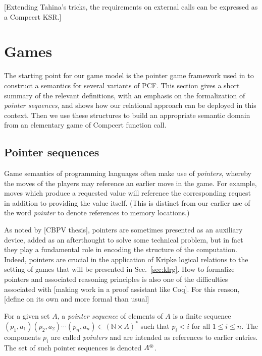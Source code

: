 \documentclass[acmsmall,anonymous]{acmart}
\begin{document}
[Extending Tahina's tricks,
the requirements on
external calls
can be expressed as a Compcert KSR.]



\section{Games} %
\label{sec:games}

The starting point for our game model
is the pointer game framework used in \citep{gamesem99}
to construct a semantics for several variants of PCF.
This section gives a short summary of the relevant definitions,
with an emphasis on the formalization of \emph{pointer sequences},
and shows how our relational approach can be deployed in this context.
Then we use these structures
to build an appropriate semantic domain
from an elementary game of Compcert function call.

\subsection{Pointer sequences} %

Game semantics of programming languages
often make use of \emph{pointers},
whereby the moves of the players
may reference an earlier move in the game.
For example,
moves which produce a requested value
will reference the corresponding request
in addition to providing the value itself.
(This is distinct from
our earlier use of the word \emph{pointer}
to denote references to memory locations.)

As noted by [CBPV thesis],
pointers are sometimes presented as an auxiliary device,
added as an afterthought to solve some technical problem,
but in fact they play a fundamental role
in encoding the structure of the computation.
Indeed,
pointers are crucial in the
application of Kripke logical relations
to the setting of games
that will be presented in Sec.~\ref{sec:klrg}.
How to formalize pointers and associated reasoning principles
is also one of the difficulties associated with
[making work in a proof assistant like Coq].
For this reason,
[define on its own and more formal than usual]

\begin{definition}
For a given set $A$,
a \emph{pointer sequence} of elements of $A$
is a finite sequence
$(p_1, a_1) (p_2, a_2) \cdots (p_n, a_n) \in (\mathbb{N} \times A)^*$
such that $p_i < i$ for all $1 \le i \le n$.
The components $p_i$ are called \emph{pointers}
and are intended as references to earlier entries.
The set of such pointer sequences is denoted $A^\oast$.
\end{definition}
\end{document}
